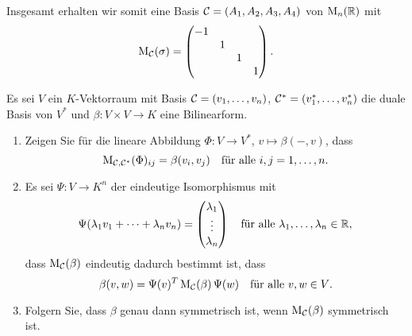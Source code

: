 \documentclass[a4paper, 10pt]{scrartcl}
\begin{document}
\begin{solution}
\begin{enumerate}[leftmargin=*]
      Insgesamt erhalten wir somit eine Basis $\mathcal{C} = (A_1, A_2, A_3, A_4)$ von $\mathrm{M}_n(\mathbb{R})$ mit
      \[
        \mathrm{M}_{\mathcal{C}}(\sigma)
        =
        \begin{pmatrix}
          -1  &   &   &   \\
              & 1 &   &   \\
              &   & 1 &   \\
              &   &   & 1
        \end{pmatrix}.
      \]
  \end{enumerate}
\end{solution}


\begin{question}
  Es sei $V$ ein $K$-Vektorraum mit Basis $\mathcal{C} = (v_1, \dotsc, v_n)$, $\mathcal{C}^* = (v_1^*, \dotsc, v_n^*)$ die duale Basis von $V^*$ und $\beta \colon V \times V \to K$ eine Bilinearform.
  \begin{enumerate}[leftmargin=*]
    \item
      Zeigen Sie für die lineare Abbildung $\Phi \colon V \to V^*$, $v \mapsto \beta(-,v)$, dass
      \[
        \mathrm{M}_{\mathcal{C}, \mathcal{C}^*}(\Phi)_{ij} = \beta(v_i, v_j)
        \quad
        \text{für alle $i, j = 1, \dotsc, n$}.
      \]
    \item
      Es sei $\Psi \colon V \to K^n$ der eindeutige Isomorphismus mit
      \[
          \Psi(\lambda_1 v_1 + \dotsb + \lambda_n v_n)
        = \begin{pmatrix} \lambda_1 \\ \vdots \\ \lambda_n \end{pmatrix}
        \quad
        \text{für alle $\lambda_1, \dotsc, \lambda_n \in \mathbb{R}$},
      \]
      dass $\mathrm{M}_{\mathcal{C}}(\beta)$ eindeutig dadurch bestimmt ist, dass
      \[
        \beta(v, w) = \Psi(v)^T \, \mathrm{M}_{\mathcal{C}}(\beta) \, \Psi(w)
        \quad
        \text{für alle $v, w \in V$}.
      \]
    \item
      Folgern Sie, dass $\beta$ genau dann symmetrisch ist, wenn $\mathrm{M}_{\mathcal{C}}(\beta)$ symmetrisch ist.
  \end{enumerate}
\end{question}














\newpage


\printsolutions
\end{document}
